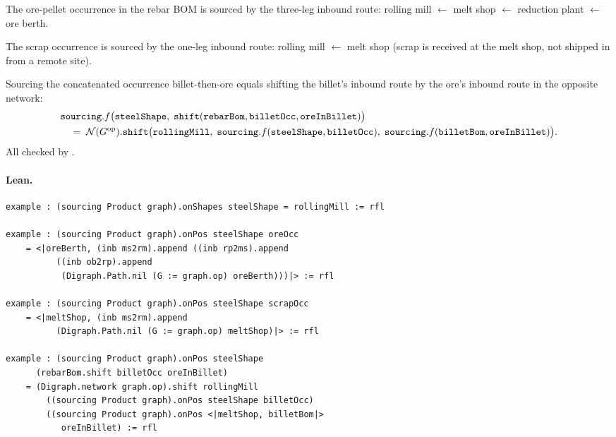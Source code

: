 \documentclass[11pt,a4paper]{article}
\begin{document}
\begin{prop}
The ore-pellet occurrence in the rebar BOM is sourced by the three-leg inbound
route: rolling mill $\leftarrow$ melt shop $\leftarrow$ reduction plant $\leftarrow$
ore berth.
\end{prop}

\begin{prop}
The scrap occurrence is sourced by the one-leg inbound route: rolling mill
$\leftarrow$ melt shop (scrap is received at the melt shop, not shipped in from
a remote site).
\end{prop}

\begin{prop}
Sourcing the concatenated occurrence billet-then-ore equals shifting the
billet's inbound route by the ore's inbound route in the opposite network:
\begin{align*}
  &\texttt{sourcing}.f\bigl(\texttt{steelShape},\;
    \texttt{shift}(\texttt{rebarBom}, \texttt{billetOcc}, \texttt{oreInBillet})\bigr) \\
  &\quad=\;
  \mathcal{N}(G^{\mathrm{op}}).\texttt{shift}\bigl(\texttt{rollingMill},\;
    \texttt{sourcing}.f(\texttt{steelShape}, \texttt{billetOcc}),\;
    \texttt{sourcing}.f(\texttt{billetBom}, \texttt{oreInBillet})\bigr).
\end{align*}
All checked by .
\end{prop}

\paragraph{Lean.}
\begin{lstlisting}[style=lean]
example : (sourcing Product graph).onShapes steelShape = rollingMill := rfl

example : (sourcing Product graph).onPos steelShape oreOcc
    = <|oreBerth, (inb ms2rm).append ((inb rp2ms).append
          ((inb ob2rp).append
           (Digraph.Path.nil (G := graph.op) oreBerth)))|> := rfl

example : (sourcing Product graph).onPos steelShape scrapOcc
    = <|meltShop, (inb ms2rm).append
          (Digraph.Path.nil (G := graph.op) meltShop)|> := rfl

example : (sourcing Product graph).onPos steelShape
      (rebarBom.shift billetOcc oreInBillet)
    = (Digraph.network graph.op).shift rollingMill
        ((sourcing Product graph).onPos steelShape billetOcc)
        ((sourcing Product graph).onPos <|meltShop, billetBom|>
           oreInBillet) := rfl
\end{lstlisting}
\end{document}
